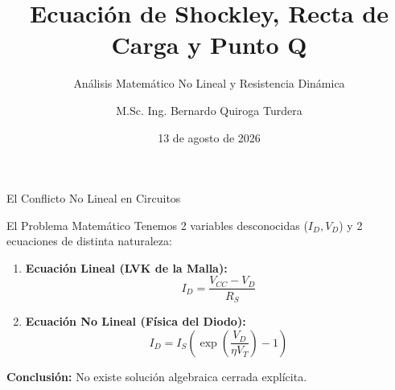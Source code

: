 \documentclass[10pt, aspectratio=169]{beamer}
\title[Shockley y Punto Q]{Ecuación de Shockley, Recta de Carga y Punto Q}
\subtitle{Análisis Matemático No Lineal y Resistencia Dinámica}
\author{M.Sc. Ing. Bernardo Quiroga Turdera}
\institute[UCB Tarija]{Universidad Católica Boliviana ``San Pablo'' -- Sede Tarija}
\date{13 de agosto de 2026}
\begin{document}
\begin{frame}
  \titlepage
\end{frame}

\begin{frame}{El Conflicto No Lineal en Circuitos}
  \begin{block}{El Problema Matemático}
    Tenemos 2 variables desconocidas ($I_D, V_D$) y 2 ecuaciones de distinta naturaleza:
  \end{block}
  \vspace{0.3cm}
  \begin{enumerate}
      \item \textbf{Ecuación Lineal (LVK de la Malla):}
      \begin{equation*}
          I_D = \frac{V_{CC} - V_D}{R_S}
      \end{equation*}
      \item \textbf{Ecuación No Lineal (Física del Diodo):}
      \begin{equation*}
          I_D = I_S \left( \exp\left(\frac{V_D}{\eta V_T}\right) - 1 \right)
      \end{equation*}
  \end{enumerate}
  \vspace{0.3cm}
  \alert{\textbf{Conclusión:}} No existe solución algebraica cerrada explícita.
\end{frame}
\end{document}
